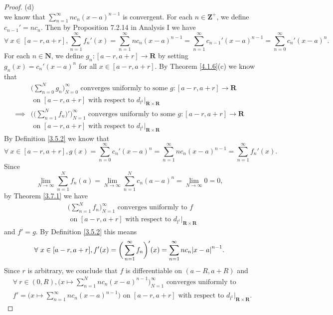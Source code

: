 \begin{proof}{(d)}
\[    \]
    we know that \(\sum_{n = 1}^\infty n c_n (x - a)^{n - 1}\) is convergent.
    For each \(n \in \mathbf{Z}^+\), we define \(c_{n - 1}' = n c_n\).
    Then by Proposition 7.2.14 in Analysis I we have
    \[
        \forall\ x \in [a - r, a + r], \sum_{n = 1}^\infty f_n'(x) = \sum_{n = 1}^\infty n c_n (x - a)^{n - 1} = \sum_{n = 1}^\infty c_{n - 1}' (x - a)^{n - 1} = \sum_{n = 0}^\infty c_n' (x - a)^n.
    \]
    For each \(n \in \mathbf{N}\), we define \(g_n : [a - r, a + r] \to \mathbf{R}\) by setting \(g_n(x) = c_n' (x - a)^n\) for all \(x \in [a - r, a + r]\).
    By Theorem \ref{4.1.6}(c) we know that
    \begin{align*}
                 & \bigg(\sum_{n = 0}^N g_n\bigg)_{N = 0}^\infty \text{ converges uniformly to some } g : [a - r, a + r] \to \mathbf{R}              \\
                 & \text{ on } [a - r, a + r] \text{ with respect to } d_{l^1}|_{\mathbf{R} \times \mathbf{R}}                                       \\
        \implies & \Bigg(\bigg(\sum_{n = 1}^N f_n\bigg)'\Bigg)_{N = 1}^\infty \text{ converges uniformly to some } g : [a - r, a + r] \to \mathbf{R} \\
                 & \text{ on } [a - r, a + r] \text{ with respect to } d_{l^1}|_{\mathbf{R} \times \mathbf{R}}
    \end{align*}
    By Definition \ref{3.5.2} we know that
    \[
        \forall\ x \in [a - r, a + r], g(x) = \sum_{n = 0}^\infty c_n' (x - a)^n = \sum_{n = 1}^\infty n c_n (x - a)^{n - 1} = \sum_{n = 1}^\infty f_n'(x).
    \]
    Since
    \[
        \lim_{N \to \infty} \sum_{n = 1}^N f_n(a) = \lim_{N \to \infty} \sum_{n = 1}^N c_n (a - a)^n = \lim_{N \to \infty} 0 = 0,
    \]
    by Theorem \ref{3.7.1} we have
    \begin{align*}
         & \bigg(\sum_{n = 1}^N f_n\bigg)_{N = 1}^\infty \text{ converges uniformly to } f             \\
         & \text{ on } [a - r, a + r] \text{ with respect to } d_{l^1}|_{\mathbf{R} \times \mathbf{R}}
    \end{align*}
    and \(f' = g\).
    By Definition \ref{3.5.2} this means
    \[
        \forall\ x \in [a - r, a + r], f'(x) = \bigg(\sum_{n = 1}^\infty f_n\bigg)'(x) = \sum_{n = 1}^\infty n c_n \abs*{x - a}^{n - 1}.
    \]
    Since \(r\) is arbitrary, we conclude that \(f\) is differentiable on \((a - R, a + R)\) and
    \begin{align*}
         & \forall\ r \in (0, R), \bigg(x \mapsto \sum_{n = 1}^N n c_n (x - a)^{n - 1}\bigg)_{N = 1}^\infty \text{ converges uniformly to }                                  \\
         & f' = \bigg(x \mapsto \sum_{n = 1}^\infty n c_n (x - a)^{n - 1}\bigg) \text{ on } [a - r, a + r] \text{ with respect to } d_{l^1}|_{\mathbf{R} \times \mathbf{R}}.
    \end{align*}
\end{proof}

